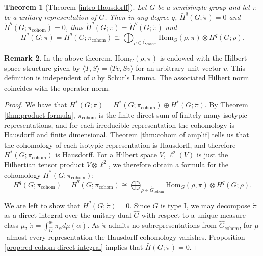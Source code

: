 \documentclass[12pt,reqno]{amsart}
\newtheorem{theorem}{Theorem}[section]
\theoremstyle{definition}
\newtheorem{remark}[theorem]{Remark}
\newcommand{\torH}{\mathring{H}}
\newcommand{\barH}{\bar{H}}
\begin{document}
\begin{theorem}[Theorem \ref{intro-Hausdorff}]\label{thm: reduced cohom}
    Let $G$ be a semisimple group and let $\pi$ be a unitary representation of $G$. Then in any degree $q$, $\barH^q(G;\mathring{\pi})=0$ and $\torH^q(G;\pi_{\mathrm{cohom}})=0$, thus $\torH^q(G;\pi)=\torH^q(G;\mathring{\pi})$ and 
    \[ \bar{H}^q(G;\pi)= \bar{H}^q(G;\pi_{\mathrm{cohom}}) \cong \bigoplus_{\rho \in \widehat{G}_{\mathrm{cohom}}} \mathrm{Hom}_G(\rho,\pi) \otimes H^q(G;\rho). \]
\end{theorem}
\begin{remark}\label{rem:hilbert structure}
    In the above theorem, $\mathrm{Hom}_G(\rho,\pi)$ is endowed with the Hilbert space structure given by $\langle T,S\rangle = \langle Tv,Sv\rangle$ for an arbitrary unit vector $v$. This definition is independent of $v$ by Schur's Lemma. The associated Hilbert norm coincides with the operator norm.
\end{remark}

\begin{proof}
    We have that $H^*(G;\pi)=H^*(G;\pi_\mathrm{cohom}) \oplus H^*(G;\mathring{\pi})$. By Theorem \ref{thm:product formula}, $\pi_\mathrm{cohom}$ is the finite direct sum of finitely many isotypic representations, and for each irreducible representation the cohomology is Hausdorff and finite dimensional. Theorem \ref{thm:cohom of amplif} tells us that the cohomology of each isotypic representation is Hausdorff, and therefore $H^*(G;\pi_\mathrm{cohom})$ is Hausdorff. For a Hilbert space $V$, $\ell^2(V)$ is just the Hilbertian tensor product $V \otimes \ell^2$, we therefore obtain a formula for the cohomology $H^*(G;\pi_\mathrm{cohom})$:
    \[ H^q(G;\pi_{\mathrm{cohom}})=\bar{H}^q(G;\pi_{\mathrm{cohom}}) \cong \bigoplus_{\rho \in \widehat{G}_{\mathrm{cohom}}} \mathrm{Hom}_G(\rho,\pi) \otimes H^q(G;\rho). \]
    
    We are left to show that $\barH^q(G;\mathring{\pi})=0$. Since $G$ is type I, we may decompose $\mathring{\pi}$ as a direct integral over the unitary dual $\widehat{G}$ with respect to a unique measure class $\mu$, $\mathring{\pi}=\int_{\widehat{G}}^{\oplus} \pi_\alpha d\mu(\alpha)$. As $\mathring{\pi}$ admits no subrepresentations from $\widehat{G}_{\mathrm{cohom}}$, for $\mu$-almost every representation the Hausdorff cohomology vanishes. Proposition \ref{prop:red cohom direct integral} implies that $\bar{H}(G;\mathring{\pi})=0$.
\end{proof}
\end{document}
